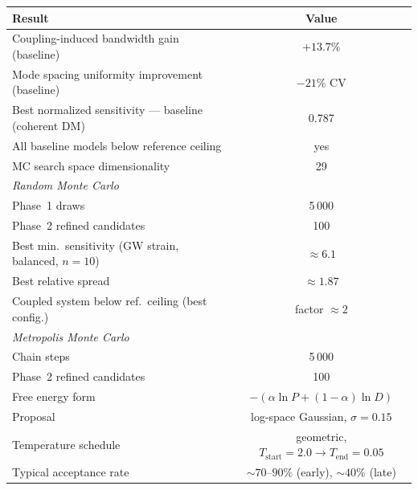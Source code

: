 \documentclass[11pt, letterpaper]{article}
\begin{document}
\begin{center}
\begin{tabular}{lc}
  \toprule
  Result & Value \\
  \midrule
  Coupling-induced bandwidth gain (baseline) & $+13.7\%$ \\
  Mode spacing uniformity improvement (baseline) & $-21\%$ CV \\
  Best normalized sensitivity --- baseline (coherent DM) & 0.787 \\
  All baseline models below reference ceiling & yes \\
  MC search space dimensionality & 29 \\
  \midrule
  \multicolumn{2}{l}{\textit{Random Monte Carlo}} \\
  Phase~1 draws & 5\,000 \\
  Phase~2 refined candidates & 100 \\
  Best min.\ sensitivity (GW strain, balanced, $n=10$) & $\approx 6.1$ \\
  Best relative spread & $\approx 1.87$ \\
  Coupled system below ref.\ ceiling (best config.) & factor $\approx 2$ \\
  \midrule
  \multicolumn{2}{l}{\textit{Metropolis Monte Carlo}} \\
  Chain steps & 5\,000 \\
  Phase~2 refined candidates & 100 \\
  Free energy form & $-(\alpha\ln P + (1{-}\alpha)\ln D)$ \\
  Proposal & log-space Gaussian, $\sigma = 0.15$ \\
  Temperature schedule & geometric, $T_\mathrm{start}=2.0 \to T_\mathrm{end}=0.05$ \\
  Typical acceptance rate & $\sim 70\text{--}90\%$ (early), $\sim 40\%$ (late) \\
  \bottomrule
\end{tabular}
\end{center}
\end{document}
